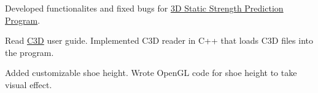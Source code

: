 \UM
{}

Developed functionalites and fixed bugs for \href{https://c4e.engin.umich.edu/tools-services/3dsspp-software/}{3D Static Strength Prediction Program}.

\begin{miniItemize}
    \item Read \href{https://www.c3d.org/}{C3D} user guide. Implemented C3D reader in C++ that loads C3D files into the program.
    \item Added customizable shoe height. Wrote OpenGL code for shoe height to take visual effect.
\end{miniItemize}
